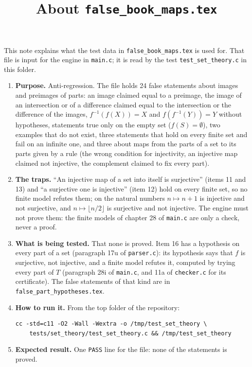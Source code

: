 \documentclass[11pt,a4paper]{article}
\title{About \texttt{false\_book\_maps.tex}}
\author{}
\date{}
\begin{document}
\maketitle
This note explains what the test data in \texttt{false\_book\_maps.tex} is used for. That file is input for the engine in \texttt{main.c}; it is read by the test \texttt{test\_set\_theory.c} in this folder.

\begin{enumerate}
\item \textbf{Purpose.} Anti-regression. The file holds 24 false statements about images and preimages of parts: an image claimed equal to a preimage, the image of an intersection or of a difference claimed equal to the intersection or the difference of the images, $f^{-1}(f(X)) = X$ and $f(f^{-1}(Y)) = Y$ without hypotheses, statements true only on the empty set ($f(S) = \emptyset$), two examples that do not exist, three statements that hold on every finite set and fail on an infinite one, and three about maps from the parts of a set to its parts given by a rule (the wrong condition for injectivity, an injective map claimed not injective, the complement claimed to fix every part).

\item \textbf{The traps.} ``An injective map of a set into itself is surjective'' (items 11 and 13) and ``a surjective one is injective'' (item 12) hold on every finite set, so no finite model refutes them; on the natural numbers $n \mapsto n + 1$ is injective and not surjective, and $n \mapsto \lfloor n / 2 \rfloor$ is surjective and not injective. The engine must not prove them: the finite models of chapter 28 of \texttt{main.c} are only a check, never a proof.

\item \textbf{What is being tested.} That none is proved. Item 16 has a hypothesis on every part of a set (paragraph 17u of \texttt{parser.c}): its hypothesis says that $f$ is surjective, not injective, and a finite model refutes it, computed by trying every part of $T$ (paragraph 28i of \texttt{main.c}, and 11a of \texttt{checker.c} for its certificate). The false statements of that kind are in \texttt{false\_part\_hypotheses.tex}.

\item \textbf{How to run it.} From the top folder of the repository:
\begin{verbatim}
cc -std=c11 -O2 -Wall -Wextra -o /tmp/test_set_theory \
    tests/set_theory/test_set_theory.c && /tmp/test_set_theory
\end{verbatim}

\item \textbf{Expected result.} One \texttt{PASS} line for the file: none of the statements is proved.
\end{enumerate}
\end{document}
